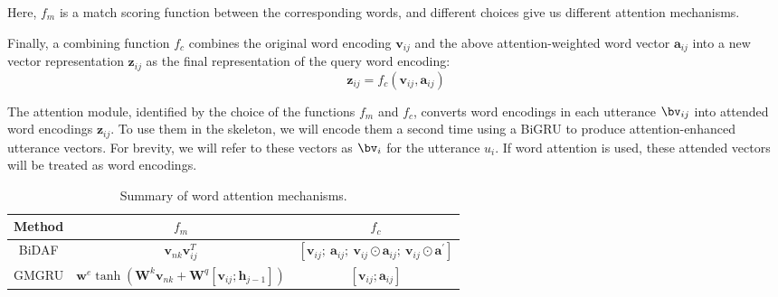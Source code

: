 Here, $f_m$ is a match scoring function between the corresponding
words, and different choices give us different attention mechanisms.

Finally, a combining function $f_{c}$ combines the original word
encoding $\bm{v}_{ij}$ and the above attention-weighted word vector
$\bm{a}_{ij}$ into a new vector representation $\bm{z}_{ij}$ as the final
representation of the query word encoding:
\begin{equation}
\bm{z}_{ij}= f_{c}(\bm{v}_{ij}, \bm{a}_{ij})
\end{equation}

The attention module, identified by the choice of the functions
$f_m$ and $f_c$, converts word encodings in each utterance
$\bv_{ij}$ into attended word encodings $\bm{z}_{ij}$. To use them
in the \HGRU skeleton, we will encode them a second time using a
BiGRU to produce attention-enhanced utterance vectors. For brevity,
we will refer to these vectors as $\bv_i$ for the utterance
$u_i$. If word attention is used, these attended vectors will be
treated as word encodings.


\begin{table}[t]
\caption{\label{tbl:word_att} Summary of word attention mechanisms.}
\begin{center}
  \setlength{\tabcolsep}{3pt}
  {
    \begin{tabular}{c|c|c}
      \toprule
      \hline
      Method & $f_{m} $                                                                          & $f_{c}$                                                 \\ \hline
      BiDAF  & $\bm{v}_{nk} {\bm{v}_{ij}^{T}}$                                  & $[\bm{v}_{ij};~\bm{a}_{ij};~\bm{v}_{ij} \odot \bm{a}_{ij};~\bm{v}_{ij}\odot \bm{a}^{\prime}]$ \\ \hline
      GMGRU  & $\bm{w}^{e} \tanh(\bm{W}^{k}\bm{v}_{nk} + \bm{W}^{q}[\bm{v}_{ij}; \bm{h}_{j-1}])$ & $[\bm{v}_{ij};\bm{a}_{ij}]$            \\ \hline
      \bottomrule
    \end{tabular}
  }
\end{center}
\end{table}


